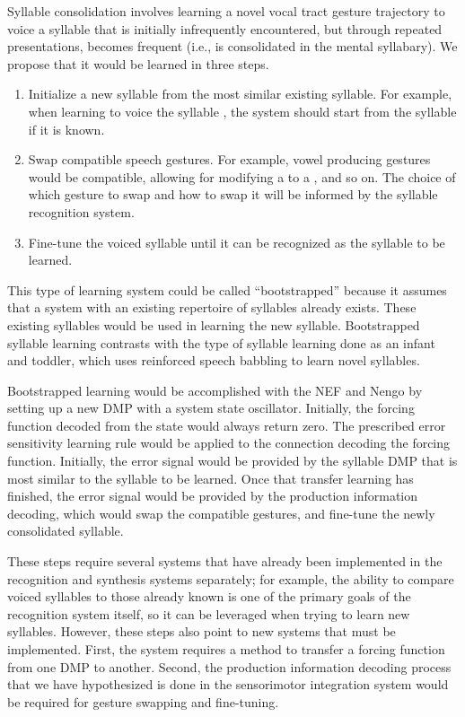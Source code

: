 Syllable consolidation involves
learning a novel vocal tract gesture trajectory
to voice a syllable that
is initially infrequently encountered,
but through repeated presentations,
becomes frequent
(i.e., is consolidated in the mental syllabary).
We propose that it would be learned
in three steps.

\begin{enumerate}
\item Initialize a new syllable from the most
  similar existing syllable.
  For example, when learning to voice
  the syllable \ipa{[bA]}, the system should
  start from the syllable \ipa{[gA]} if it is known.
\item Swap compatible speech gestures.
  For example, vowel producing gestures
  would be compatible, allowing for modifying
  a \ipa{[bA]} to a \ipa{[bu]}, and so on.
  The choice of which gesture to swap and
  how to swap it will be informed by
  the syllable recognition system.
\item Fine-tune the voiced syllable
  until it can be recognized as the
  syllable to be learned.
\end{enumerate}

This type of learning system
could be called ``bootstrapped''
because it assumes that a system
with an existing repertoire of syllables
already exists.
These existing syllables would be
used in learning the new syllable.
Bootstrapped syllable learning contrasts with
the type of syllable learning
done as an infant and toddler,
which uses reinforced speech babbling
to learn novel syllables.

Bootstrapped learning
would be accomplished with the NEF and Nengo
by setting up a new DMP with a system state oscillator.
Initially, the forcing function decoded from the state
would always return zero.
The prescribed error sensitivity learning rule
\citep{macneil2011,bekolay2011}
would be applied to the
connection decoding the forcing function.
Initially, the error signal would be provided
by the syllable DMP that is most similar
to the syllable to be learned.
Once that transfer learning has finished,
the error signal would be provided by
the production information decoding,
which would swap the compatible gestures,
and fine-tune the newly consolidated syllable.

These steps require several systems
that have already been implemented
in the recognition and synthesis systems separately;
for example, the ability to compare
voiced syllables to those already known
is one of the primary goals
of the recognition system itself,
so it can be leveraged when trying to learn new syllables.
However, these steps also point to new systems
that must be implemented.
First, the system requires a method
to transfer a forcing function
from one DMP to another.
Second, the production information decoding process
that we have hypothesized is done
in the sensorimotor integration system
would be required for gesture swapping
and fine-tuning.


